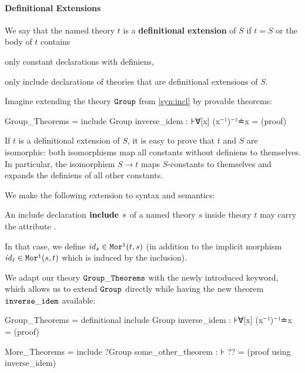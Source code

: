 \paragraph{Definitional Extensions}
We say that the named theory $t$ is a \textbf{definitional extension} of $S$ if $t=S$ or the body of $t$ contains
\begin{compactitem}
 \item only constant declarations with definiens,
 \item only include declarations of theories that are definitional extensions of $S$.
\end{compactitem}
\begin{example}
	Imagine extending the theory $\operatorname{\mathtt{Group}}$ from \autoref{syn:incl} by provable theorems:
		\begin{mmtcode}
Group_Theorems =
  include Group
  inverse_idem : ⊦∀[x] (x⁻¹)⁻¹≐x 	= (proof)
\end{mmtcode}
\end{example}

If $t$ is a definitional extension of $S$, it is easy to prove that $t$ and $S$ are isomorphic: both isomorphisms map all constants without definiens to themselves. In particular, the isomorphism $S\to t$ maps $S$-constants to themselves and expands the definiens of all other constants.

We make the following extension to syntax and semantics:
\begin{compactitem}
  \item An include declaration $\operatorname{\mathbf{include}}{\;s}$ of a named theory $s$ inside theory $t$ may carry the attribute .
  \item In that case, we define $\mathit{id}_{s}\in\mathtt{Mor^i}(t,s)$ (in addition to the implicit morphism $\mathit{id}_{t}\in\mathtt{Mor^i}(s,t)$ which is induced by the inclusion).
\end{compactitem}
\begin{example}
	We adapt our theory $\operatorname{\mathtt{Group\_Theorems}}$ with the newly introduced keyword, which allows us to extend $\operatorname{\mathtt{Group}}$ directly while having the new theorem $\operatorname{\mathtt{inverse\_idem}}$ available:
		\begin{mmtcode}
Group_Theorems =
  definitional include Group
  inverse_idem : ⊦∀[x] (x⁻¹)⁻¹≐x 	= (proof)

More_Theorems =
  include ?Group
  some_other_theorem : ⊦ ??	= (proof using inverse_idem)
\end{mmtcode}
\end{example}

